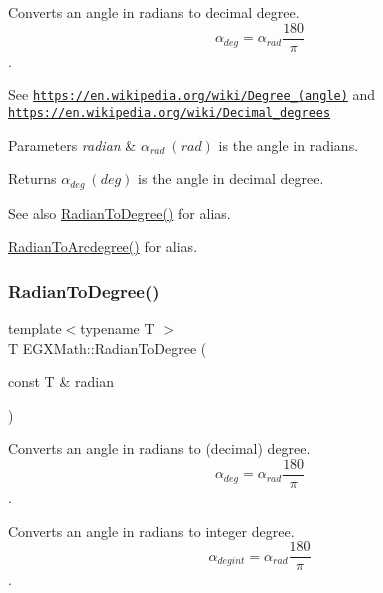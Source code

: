 Converts an angle in radians to decimal degree. \[\alpha_{deg}=\alpha_{rad}\frac{180}{\pi}\]. 

See \href{https://en.wikipedia.org/wiki/Degree_(angle)}{\tt https\+://en.\+wikipedia.\+org/wiki/\+Degree\+\_\+(angle)} and \href{https://en.wikipedia.org/wiki/Decimal_degrees}{\tt https\+://en.\+wikipedia.\+org/wiki/\+Decimal\+\_\+degrees} 
\begin{DoxyParams}{Parameters}
{\em radian} & $\alpha_{rad}\ (rad)$ is the angle in radians. \\
\hline
\end{DoxyParams}
\begin{DoxyReturn}{Returns}
$\alpha_{deg}\ (deg)$ is the angle in decimal degree. 
\end{DoxyReturn}
\begin{DoxySeeAlso}{See also}
\mbox{\hyperlink{group___e_g_x_math-_angle_conversions-_radian_ga25bbce6cdc1c3621f2a158d320e3bc45}{Radian\+To\+Degree()}} for alias. 

\mbox{\hyperlink{group___e_g_x_math-_angle_conversions-_radian_ga3dfdc97357cc07f8379976bbc08f9852}{Radian\+To\+Arcdegree()}} for alias. 
\end{DoxySeeAlso}
\mbox{\label{group___e_g_x_math-_angle_conversions-_radian_ga25bbce6cdc1c3621f2a158d320e3bc45}} 
\subsubsection{\texorpdfstring{Radian\+To\+Degree()}{RadianToDegree()}}
{\footnotesize\ttfamily template$<$typename T $>$ \\
T E\+G\+X\+Math\+::\+Radian\+To\+Degree (\begin{DoxyParamCaption}\item[{const T \&}]{radian }\end{DoxyParamCaption})}



Converts an angle in radians to (decimal) degree. \[\alpha_{deg}=\alpha_{rad}\frac{180}{\pi}\]. 

Converts an angle in radians to integer degree. \[\alpha_{deg int}=\alpha_{rad}\frac{180}{\pi}\].

